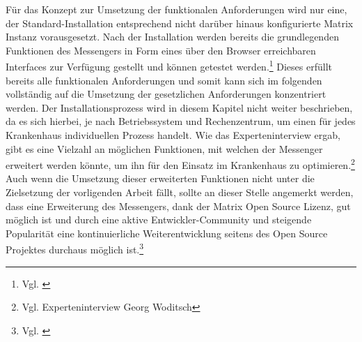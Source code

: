 Für das Konzept zur Umsetzung der funktionalen Anforderungen wird nur eine, der Standard-Installation entsprechend nicht darüber hinaus konfigurierte Matrix Instanz vorausgesetzt. Nach der Installation werden bereits die grundlegenden Funktionen des Messengers in Form eines über den Browser erreichbaren Interfaces zur Verfügung gestellt und können getestet werden.\footnote{Vgl. \cite{Matrix.org2020}} Dieses erfüllt bereits alle funktionalen Anforderungen und somit kann sich im folgenden vollständig auf die Umsetzung der gesetzlichen Anforderungen konzentriert werden.
Der Installationsprozess wird in diesem Kapitel nicht weiter beschrieben, da es sich hierbei, je nach Betriebssystem und Rechenzentrum, um einen für jedes Krankenhaus individuellen Prozess handelt.
Wie das Experteninterview ergab, gibt es eine Vielzahl an möglichen Funktionen, mit welchen der Messenger erweitert werden könnte, um ihn für den Einsatz im Krankenhaus zu optimieren.\footnote{Vgl. Experteninterview Georg Woditsch} Auch wenn die Umsetzung dieser erweiterten Funktionen nicht unter die Zielsetzung der vorligenden Arbeit fällt, sollte an dieser Stelle angemerkt werden, dass eine Erweiterung des Messengers, dank der Matrix Open Source Lizenz, gut möglich ist und durch eine aktive Entwickler-Community und steigende Popularität eine kontinuierliche Weiterentwicklung seitens des Open Source Projektes durchaus möglich ist.\footnote{Vgl. \cite{Github2020}}

